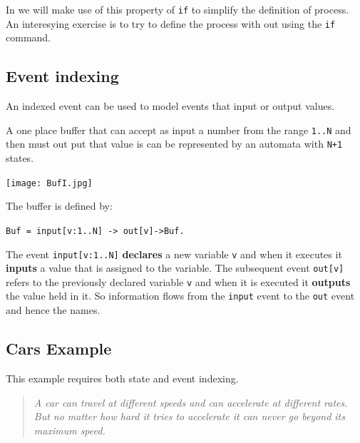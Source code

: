 \documentclass[]{article}
\begin{document}


In  we will make use of this property of \verb|if| to simplify the definition of process. An interesying exercise is to try to define the process with out using the \verb|if| command.

\subsection{Event indexing} \label{sec:EventIx}

An indexed event  can be used to model events that input or output values.

A one place buffer that can accept as input a number from the range \verb$1..N$ and then must out put that value is can be represented by an automata with \verb$N+1$ states.

\noindent\begin{center} \texttt{[image: BufI.jpg]} \end{center}

The buffer is  defined by:
\begin{center}\verb$Buf = input[v:1..N] -> out[v]->Buf.$\end{center}

The event \verb$input[v:1..N]$  {\bf declares} a new variable \verb|v|  and when it executes  it  {\bf inputs} a value that is assigned to the variable.  The subsequent event \verb|out[v]|  refers to the previously declared variable  \verb|v| and when it is executed it {\bf outputs} the value held in it. So information flows from the \verb|input| event to the \verb|out| event and hence the names.


\subsection{Cars Example}
This example requires  both state and event indexing.
\begin{quotation}
\emph{A car can travel at different speeds and can accelerate at different rates. But no matter how hard it tries to accelerate it can never go beyond its maximum speed.}
\end{quotation}
\end{document}
